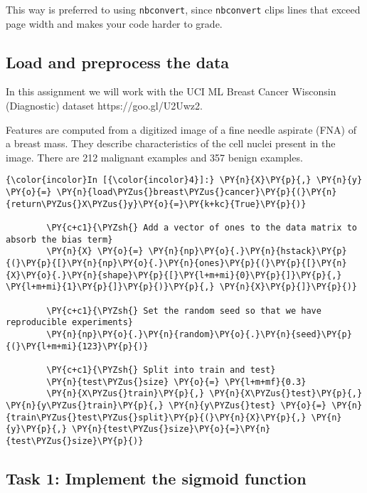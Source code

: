 This way is preferred to using \texttt{nbconvert}, since
\texttt{nbconvert} clips lines that exceed page width and makes your
code harder to grade.

    \hypertarget{load-and-preprocess-the-data}{%
\subsection{Load and preprocess the
data}\label{load-and-preprocess-the-data}}

    In this assignment we will work with the UCI ML Breast Cancer Wisconsin
(Diagnostic) dataset https://goo.gl/U2Uwz2.

Features are computed from a digitized image of a fine needle aspirate
(FNA) of a breast mass. They describe characteristics of the cell nuclei
present in the image. There are 212 malignant examples and 357 benign
examples.

    \begin{Verbatim}[commandchars=\\\{\}]
{\color{incolor}In [{\color{incolor}4}]:} \PY{n}{X}\PY{p}{,} \PY{n}{y} \PY{o}{=} \PY{n}{load\PYZus{}breast\PYZus{}cancer}\PY{p}{(}\PY{n}{return\PYZus{}X\PYZus{}y}\PY{o}{=}\PY{k+kc}{True}\PY{p}{)}
        
        \PY{c+c1}{\PYZsh{} Add a vector of ones to the data matrix to absorb the bias term}
        \PY{n}{X} \PY{o}{=} \PY{n}{np}\PY{o}{.}\PY{n}{hstack}\PY{p}{(}\PY{p}{[}\PY{n}{np}\PY{o}{.}\PY{n}{ones}\PY{p}{(}\PY{p}{[}\PY{n}{X}\PY{o}{.}\PY{n}{shape}\PY{p}{[}\PY{l+m+mi}{0}\PY{p}{]}\PY{p}{,} \PY{l+m+mi}{1}\PY{p}{]}\PY{p}{)}\PY{p}{,} \PY{n}{X}\PY{p}{]}\PY{p}{)}
        
        \PY{c+c1}{\PYZsh{} Set the random seed so that we have reproducible experiments}
        \PY{n}{np}\PY{o}{.}\PY{n}{random}\PY{o}{.}\PY{n}{seed}\PY{p}{(}\PY{l+m+mi}{123}\PY{p}{)}
        
        \PY{c+c1}{\PYZsh{} Split into train and test}
        \PY{n}{test\PYZus{}size} \PY{o}{=} \PY{l+m+mf}{0.3}
        \PY{n}{X\PYZus{}train}\PY{p}{,} \PY{n}{X\PYZus{}test}\PY{p}{,} \PY{n}{y\PYZus{}train}\PY{p}{,} \PY{n}{y\PYZus{}test} \PY{o}{=} \PY{n}{train\PYZus{}test\PYZus{}split}\PY{p}{(}\PY{n}{X}\PY{p}{,} \PY{n}{y}\PY{p}{,} \PY{n}{test\PYZus{}size}\PY{o}{=}\PY{n}{test\PYZus{}size}\PY{p}{)}
\end{Verbatim}

    \hypertarget{task-1-implement-the-sigmoid-function}{%
\subsection{Task 1: Implement the sigmoid
function}\label{task-1-implement-the-sigmoid-function}}

